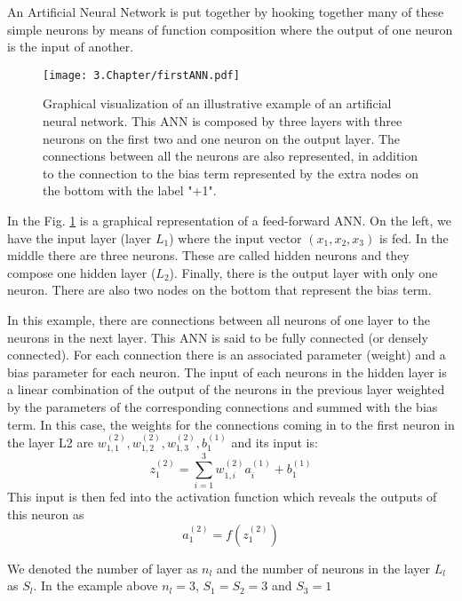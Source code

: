 An Artificial Neural Network is put together by hooking together many of these simple neurons by means of function composition where the output of one neuron is the input of another.


\begin{figure}[!h]
	\centering
	\texttt{[image: 3.Chapter/firstANN.pdf]}
	\caption{Graphical visualization of an illustrative example of an artificial neural network. This ANN is composed by three layers with three neurons on the first two and one neuron on the output layer. The connections between all the neurons are also represented, in addition to the connection to the bias term represented by the extra nodes on the bottom with the label "+1".
}
\label{fig:first-ANN}
\end{figure}
In the Fig. \ref{fig:first-ANN} is a graphical representation of a feed-forward ANN. On the left, we have the input layer (layer $L_1$) where the input vector $(x_1,x_2,x_3)$ is fed. In the middle there are three neurons. These are called hidden neurons and they compose one hidden layer ($L_2$). Finally, there is the output layer with only one neuron. There are also two nodes on the bottom that represent the bias term.

In this example, there are connections between all neurons of one layer to the neurons in the next layer. This ANN is said to be fully connected (or densely connected). For each connection there is an associated parameter (weight) and a bias parameter for each neuron. The input of each neurons in the hidden layer is a linear combination of the output of the neurons in the previous layer weighted by the parameters of the corresponding connections and summed with the bias term. In this case, the weights for the connections coming in to the first neuron in the layer L2 are $w_{1,1}^{(2)},w_{1,2}^{(2)},w_{1,3}^{(2)}, b_1^{( 1 )}$ and its input is:
\begin{equation}
z_1^{(2)} = \sum_{i=1}^3 w_{1,i}^{(2)} a_i^{(1)} + b_1^{(1)}
\end{equation}
This input is then fed into the activation function which reveals the outputs of this neuron as 
\begin{equation}
a_1^{( 2 )} = f\left( z_1^{(2)} \right)
\end{equation}

We denoted the number of layer as $n_l$ and the number of neurons in the layer $L_l$ as $S_l$. In the example above $n_l=3$, $S_1 = S_2 = 3$ and $S_3 = 1$

